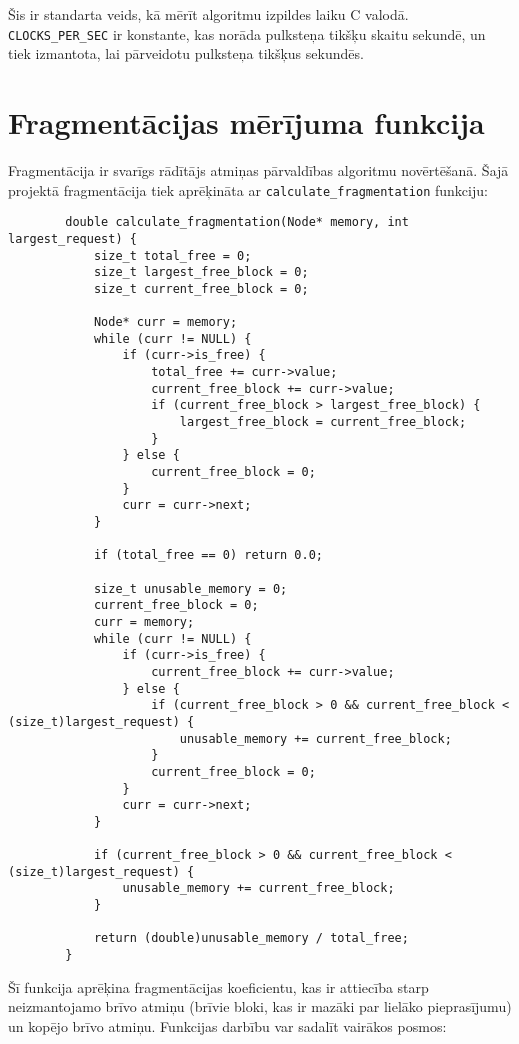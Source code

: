 \documentclass{report}
\begin{document}
	Šis ir standarta veids, kā mērīt algoritmu izpildes laiku C valodā. \texttt{CLOCKS\_PER\_SEC} ir konstante, kas norāda pulksteņa tikšķu skaitu sekundē, un tiek izmantota, lai pārveidotu pulksteņa tikšķus sekundēs.
	
	\section{Fragmentācijas mērījuma funkcija}
	
	Fragmentācija ir svarīgs rādītājs atmiņas pārvaldības algoritmu novērtēšanā. Šajā projektā fragmentācija tiek aprēķināta ar \texttt{calculate\_fragmentation} funkciju:
	
	\begin{verbatim}
		double calculate_fragmentation(Node* memory, int largest_request) {
			size_t total_free = 0;
			size_t largest_free_block = 0;
			size_t current_free_block = 0;
			
			Node* curr = memory;
			while (curr != NULL) {
				if (curr->is_free) {
					total_free += curr->value;
					current_free_block += curr->value;
					if (current_free_block > largest_free_block) {
						largest_free_block = current_free_block;
					}
				} else {
					current_free_block = 0;
				}
				curr = curr->next;
			}
			
			if (total_free == 0) return 0.0;
			
			size_t unusable_memory = 0;
			current_free_block = 0;
			curr = memory;
			while (curr != NULL) {
				if (curr->is_free) {
					current_free_block += curr->value;
				} else {
					if (current_free_block > 0 && current_free_block < (size_t)largest_request) {
						unusable_memory += current_free_block;
					}
					current_free_block = 0;
				}
				curr = curr->next;
			}
			
			if (current_free_block > 0 && current_free_block < (size_t)largest_request) {
				unusable_memory += current_free_block;
			}
			
			return (double)unusable_memory / total_free;
		}
	\end{verbatim}
	
	Šī funkcija aprēķina fragmentācijas koeficientu, kas ir attiecība starp neizmantojamo brīvo atmiņu (brīvie bloki, kas ir mazāki par lielāko pieprasījumu) un kopējo brīvo atmiņu. Funkcijas darbību var sadalīt vairākos posmos:
	
\end{document}

